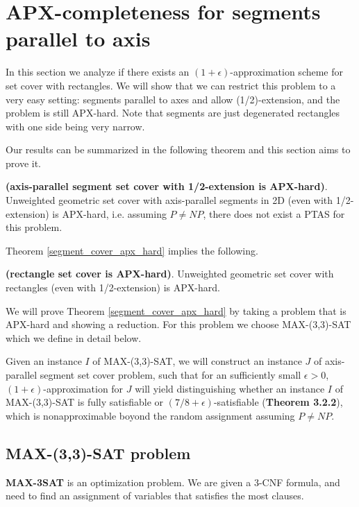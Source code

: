 \section{APX-completeness for segments parallel to axis}
\label{section:segment_apx}

In this section we analyze if there exists an
$(1+\epsilon)$-approximation
scheme for set cover with rectangles.
We will show that we can restrict this problem
to a very easy setting:
segments parallel to axes and allow (1/2)-extension,
and the problem is still APX-hard.
Note that segments are just degenerated rectangles
with one side being very narrow.


Our results can be summarized in the following
theorem and this section aims to prove it.

\begin{tw}{
\label{segment_cover_apx_hard}
	\textbf{(axis-parallel segment set cover with 1/2-extension is APX-hard)}.	
	Unweighted geometric set cover
	with axis-parallel segments in 2D (even with 1/2-extension)
	is APX-hard,
	i.e. assuming $P\neq NP$, there does not exist a PTAS
	for this problem.
}\end{tw}
 
Theorem \ref{segment_cover_apx_hard} implies the following.

\begin{corollary}{
\label{rectangle_cover_apx_hard}
	\textbf{(rectangle set cover is APX-hard)}.	
	Unweighted geometric set cover
	with rectangles (even with 1/2-extension) is APX-hard.
}\end{corollary}


We will prove Theorem \ref{segment_cover_apx_hard}
by taking a problem that is APX-hard
and showing a reduction.
For this problem we choose
MAX-(3,3)-SAT which we define in detail below.

Given an instance $I$ of MAX-(3,3)-SAT,
we will construct an instance $J$ of 
axis-parallel segment set cover problem,
such that for an sufficiently small $\epsilon > 0$,
$(1+\epsilon)$-approximation for $J$
will yield distinguishing  whether an instance $I$ of MAX-(3,3)-SAT
is fully satisfiable
or $(7/8 + \epsilon)$-satisfiable (\textbf{Theorem 3.2.2}), which 
is nonapproximable boyond the random assignment assuming $P\neq NP$.

\subsection{MAX-(3,3)-SAT problem}
\begin{defi}
\textbf{MAX-3SAT} is an optimization problem. We are given a 3-CNF
formula, and need to find an assignment of variables
that satisfies the most clauses.
\end{defi}

